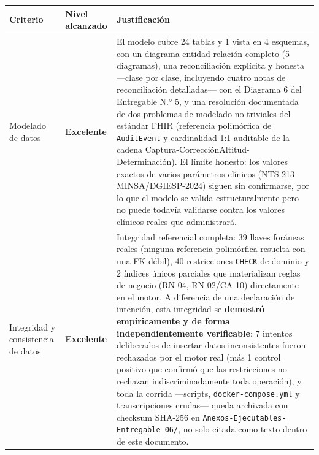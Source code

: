\documentclass[11pt,a4paper]{article}
\begin{document}
{\small
\begin{longtable}[]{@{}
  >{\raggedright\arraybackslash}p{}
  >{\raggedright\arraybackslash}p{}
  >{\raggedright\arraybackslash}p{}@{}}
\toprule\noalign{}
\begin{minipage}[b]{\linewidth}\raggedright
Criterio
\end{minipage} & \begin{minipage}[b]{\linewidth}\raggedright
Nivel alcanzado
\end{minipage} & \begin{minipage}[b]{\linewidth}\raggedright
Justificación
\end{minipage} \\
\midrule\noalign{}
\endhead
\bottomrule\noalign{}
\endlastfoot
Modelado de datos & \textbf{Excelente} & El modelo cubre 24 tablas y 1 vista en 4 esquemas, con un diagrama entidad-relación completo (5 diagramas), una reconciliación explícita y honesta ---clase por clase, incluyendo cuatro notas de reconciliación detalladas--- con el Diagrama 6 del Entregable N.° 5, y una resolución documentada de dos problemas de modelado no triviales del estándar FHIR (referencia polimórfica de \texttt{AuditEvent} y cardinalidad 1:1 auditable de la cadena Captura-CorrecciónAltitud-Determinación). El límite honesto: los valores exactos de varios parámetros clínicos (NTS 213-MINSA/DGIESP-2024) siguen sin confirmarse, por lo que el modelo se valida estructuralmente pero no puede todavía validarse contra los valores clínicos reales que administrará. \\
Integridad y consistencia de datos & \textbf{Excelente} & Integridad referencial completa: 39 llaves foráneas reales (ninguna referencia polimórfica resuelta con una FK débil), 40 restricciones \texttt{CHECK} de dominio y 2 índices únicos parciales que materializan reglas de negocio (RN-04, RN-02/CA-10) directamente en el motor. A diferencia de una declaración de intención, esta integridad se \textbf{demostró empíricamente y de forma independientemente verificable}: 7 intentos deliberados de insertar datos inconsistentes fueron rechazados por el motor real (más 1 control positivo que confirmó que las restricciones no rechazan indiscriminadamente toda operación), y toda la corrida ---scripts, \texttt{docker-compose.yml} y transcripciones crudas--- queda archivada con checksum SHA-256 en \texttt{Anexos-Ejecutables-Entregable-06/}, no solo citada como texto dentro de este documento. \\

\end{longtable}}
\end{document}
